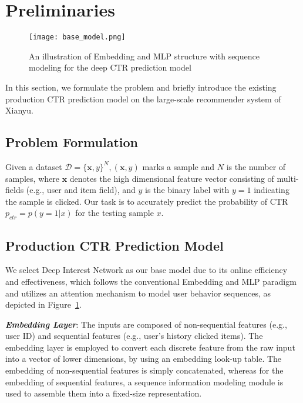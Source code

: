 \section{Preliminaries}

\begin{figure}[tbp]
    \centerline{\texttt{[image: base\_model.png]}}
    \caption{An illustration of Embedding and MLP structure with sequence modeling for the deep CTR prediction model}
    \label{fig:din_model}
\end{figure}


In this section, we formulate the problem and briefly introduce the existing production CTR prediction model on the large-scale recommender system of Xianyu.

\subsection{Problem Formulation}
Given a dataset $\mathcal{D}=\{ \mathbf{x}, y \}^N,(\mathbf{x}, y)$ marks a sample and $N$ is the number of samples, where $\mathbf{x}$ denotes the high dimensional feature vector consisting of multi-fields (e.g., user and item field), and $y$ is the binary label with $y = 1$ indicating the sample is clicked. Our task is to accurately predict the probability of CTR $p_{ctr} = p(y=1|x)$ for the testing sample $x$.

\subsection{Production CTR Prediction Model}

We select Deep Interest Network \cite{din} as our base model due to its online efficiency and effectiveness, which follows the conventional Embedding and MLP paradigm and utilizes an attention mechanism to model user behavior sequences, as depicted in Figure~\ref{fig:din_model}.

\textit{\textbf{Embedding Layer}}: 
The inputs are composed of non-sequential features (e.g., user ID) and sequential features (e.g., user’s history clicked items). The embedding layer is employed to convert each discrete feature from the raw input into a vector of lower dimensions, by using an embedding look-up table. The embedding of non-sequential features is simply concatenated, whereas for the embedding of sequential features, a sequence information modeling module is used to assemble them into a fixed-size representation.


